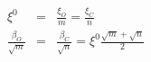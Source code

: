 \documentclass[12pt]{article}
\begin{document}
\begin{eqnarray*}
\xi^0 & = & \frac{\xi_O}{m} = \frac{\xi_C}{n} \\
\frac{\beta_O}{\sqrt{m}} & = & \frac{\beta_C}{\sqrt{n}} = \xi^0 \frac{\sqrt{m}+\sqrt{n}}{2}\\
\end{eqnarray*}
\end{document}
